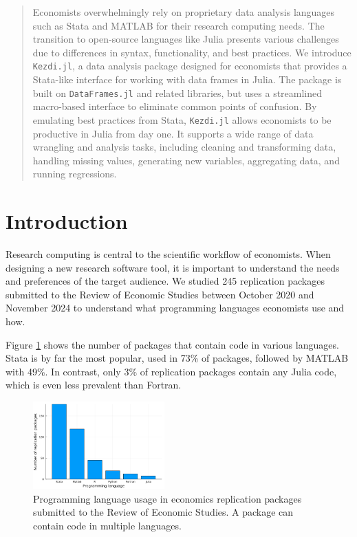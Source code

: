 \documentclass{juliacon}
\begin{document}

\maketitle

\begin{abstract}
Economists overwhelmingly rely on proprietary data analysis languages such as Stata and MATLAB for their research computing needs. The transition to open-source languages like Julia presents various challenges due to differences in syntax, functionality, and best practices. We introduce \texttt{Kezdi.jl}, a data analysis package designed for economists that provides a Stata-like interface for working with data frames in Julia. The package is built on \texttt{DataFrames.jl} and related libraries, but uses a streamlined macro-based interface to eliminate common points of confusion. By emulating best practices from Stata, \texttt{Kezdi.jl} allows economists to be productive in Julia from day one. It supports a wide range of data wrangling and analysis tasks, including cleaning and transforming data, handling missing values, generating new variables, aggregating data, and running regressions.
\end{abstract}

\section{Introduction}

Research computing is central to the scientific workflow of economists. When designing a new research software tool, it is important to understand the needs and preferences of the target audience. We studied 245 replication packages submitted to the Review of Economic Studies between October 2020 and November 2024 to understand what programming languages economists use and how.

Figure \ref{fig:languages} shows the number of packages that contain code in various languages. Stata is by far the most popular, used in 73\% of packages, followed by MATLAB with 49\%. In contrast, only 3\% of replication packages contain any Julia code, which is even less prevalent than Fortran.

\begin{figure}[h]
\centering
\includegraphics[width=0.45\textwidth]{languages.png}
\caption{Programming language usage in economics replication packages submitted to the Review of Economic Studies. A package can contain code in multiple languages.}
\label{fig:languages}
\end{figure}
\end{document}
